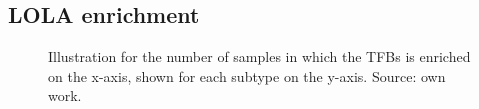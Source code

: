 \documentclass[pdftex,12pt,a4paper]{report}
\begin{document}
\subsection{LOLA enrichment}
\begin{figure}[!ht]
\begin{center}
	\caption{Illustration for the number of samples in which the TFBs is enriched on the x-axis, shown for each subtype on the y-axis. Source: own work.}
	\label{lola_result}
\end{center}
\end{figure} 
\end{document}
